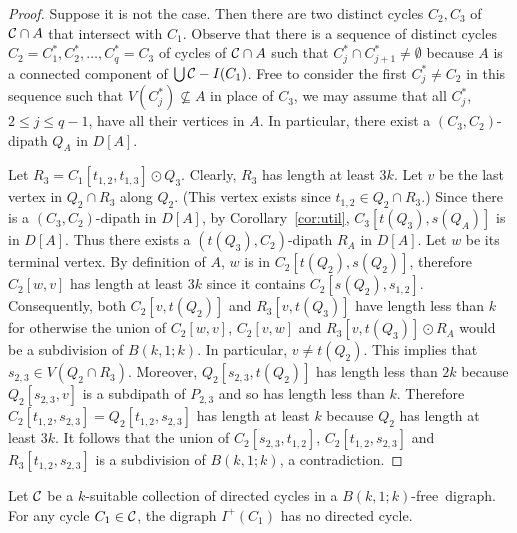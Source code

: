 \documentclass{endm}
\begin{document}
\begin{proof}
Suppose it is not the case. Then there are two distinct cycles $C_2, C_3$ of ${\cal C}\cap A$ that intersect with $C_1$.
Observe that there is a sequence of distinct cycles $C_2=C^*_1, C^*_2, \dots , C^*_q=C_3$ of cycles of ${\cal C}\cap A$ such that $C^*_j\cap C^*_{j+1}\neq \emptyset$ because $A$ is a connected component of $\bigcup{\cal C} - I(C_1)$.
Free to consider the first $C^*_j \neq C_2$ in this sequence such that $V(C^*_j)\not\subseteq A$ in place of $C_3$, we may assume
 that all $C^*_j$, $2\leq j\leq q-1$, have all their vertices in $A$.
 In particular, there exist a  $(C_3,C_2)$-dipath $Q_A$ in $D[A]$.

Let $R_3=C_1[t_{1,2},t_{1,3}]\odot Q_3$. Clearly, $R_3$ has length at least $3k$.
Let $v$ be the last vertex in $Q_2\cap R_3$ along $Q_2$. (This vertex exists since $t_{1,2}\in Q_2\cap R_3$.) Since there is a $(C_3,C_2)$-dipath in $D[A]$, by Corollary~\ref{cor:util}, $C_3[t(Q_3), s(Q_A)]$ is in $D[A]$. Thus  there exists a $(t(Q_3), C_2)$-dipath $R_A$ in $D[A]$.  Let $w$ be its terminal vertex. By definition of $A$, $w$ is in $C_2[t(Q_2), s(Q_2)]$, therefore $C_2[w,v]$ has length at least $3k$ since it contains $C_2[s(Q_2), s_{1,2}]$. Consequently, both $C_2[v,t(Q_2)]$ and $R_3[v,t(Q_3)]$ have length less than $k$ for otherwise the union of $C_2[w,v]$, $C_2[v,w]$ and $R_3[v,t(Q_3)]\odot R_A$ would be a subdivision of $B(k,1;k)$.
In particular, $v\neq t(Q_2)$. This implies that $s_{2,3}\in V(Q_2\cap R_3)$.
Moreover, $Q_2[s_{2,3}, t(Q_2)]$ has length less than $2k$ because $Q_2[s_{2,3},v]$ is a subdipath of $P_{2,3}$ and so has length less than $k$.
Therefore $C_2[t_{1,2},s_{2,3}]=Q_2[t_{1,2},s_{2,3}]$ has length at least $k$ because $Q_2$ has length at least $3k$.
It follows that the union of $C_2[s_{2,3},t_{1,2}]$,  $C_2[t_{1,2},s_{2,3}]$ and  $R_3[t_{1,2},s_{2,3}]$ is a subdivision of $B(k,1;k)$, a contradiction.
\end{proof}



\begin{lemma}\label{lem:no-dicycle}
Let ${\cal C}$ be a $k$-suitable collection of directed cycles in a $B(k,1;k)$-free\ digraph. For any cycle $C_1\in {\cal C}$, the digraph
$I^+(C_1)$ has no directed cycle.  
\end{lemma}
\end{document}
